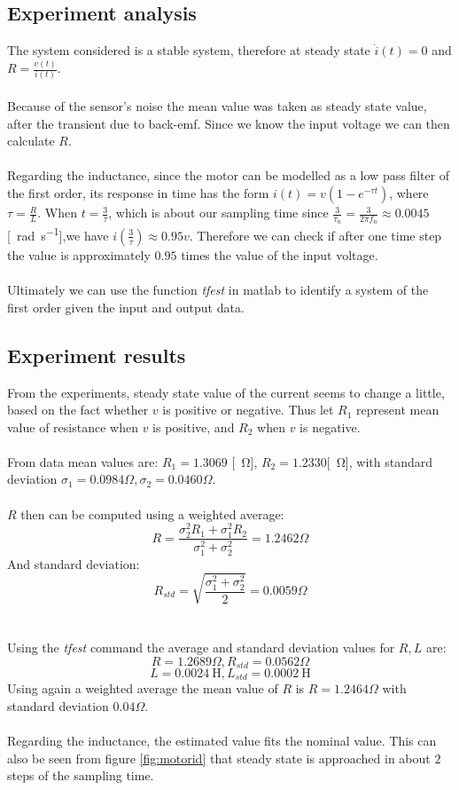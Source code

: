 \subsection{Experiment analysis}
The system considered is a stable system, therefore at steady state $\dot{i}(t) = 0$ and $R = \frac{v(t)}{i(t)}$. \\ \\
Because of the sensor's noise the mean value was taken as steady state value, after the transient due to back-emf. Since we know the input voltage we can then calculate $R$. \\ \\
Regarding the inductance, since the motor can be modelled as a low pass filter of the first order, its response in time has the form $i(t) = v (1-e^{-\tau t})$, where $\tau = \frac{R}{L}$.  When $t=\frac{3}{\tau}$, which is about our sampling time since $\frac{3}{\tau_n}=\frac{3}{2\pi f_n} \approx 0.0045$ [\SI{}{\radian \per \second}],we have $i(\frac{3}{\tau}) \approx 0.95v$. Therefore we can check if after one time step the value is approximately $0.95$ times the value of the input voltage. \\ \\ 
Ultimately we can use the function \emph{tfest} in matlab to identify a system of the first order given the input and output data.
\subsection{Experiment results}
From the experiments, steady state value of the current seems to change a little, based on the fact whether $v$ is positive or negative.
Thus let $R_1$ represent mean value of resistance when $v$ is positive, and $R_2$ when $v$ is negative.\\ \\
From data  mean values are: $R_1 =1.3069	$ [\SI{}{\ohm}], $R_2=1.2330$[\SI{}{\ohm}], with standard deviation $\sigma_1= 0.0984 \Omega, \sigma_2=0.0460 \Omega
$. \\ \\
$R$ then can be computed using a weighted average:
$$R = \frac{\sigma_2^2 R_1 + \sigma_1^2 R_2}{\sigma_1^2+\sigma_2^2} = 1.2462 \Omega$$
And standard deviation:
$$R_{std} = \sqrt{\frac{\sigma_1^2+\sigma_2^2}{2} }=0.0059 \Omega$$
\\ \\
Using the \emph{tfest} command the average and standard deviation values for $R,L$ are:
$$
R = 1.2689 \Omega, R_{std} = 0.0562 \Omega$$
$$
L = 0.0024 \SI{}{\henry}, L_{std} = 0.0002 \SI{}{\henry}$$
Using again a weighted average the mean value of $R$ is $R=1.2464 \Omega$ with standard deviation $0.04 \Omega$. \\ \\
Regarding the inductance, the estimated value fits the nominal value. This can also be seen from figure \ref{fig:motorid} that  steady state is approached in about $2$ steps of the sampling time.\\


